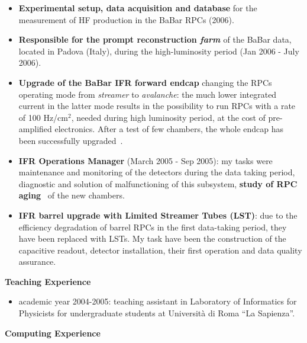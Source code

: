 \documentclass[11pt,twoside,a4paper]{article}
\begin{document}
\begin{enumerate}
\begin{itemize}
  \item {\bf Experimental setup, data acquisition and database} 
    for the measurement of HF production in the BaBar RPCs (2006).
    
  \item {\bf Responsible for the prompt reconstruction {\it farm }}
    of the BaBar data, located in Padova (Italy), during the
    high-luminosity period (Jan 2006 - July 2006).

  \item {\bf Upgrade of the BaBar IFR forward endcap} changing the
    RPCs operating mode from {\it streamer} to {\it avalanche}: the
    much lower integrated current in the latter mode results in the
    possibility to run RPCs with a rate of 100 Hz/cm$^2$, needed
    during high luminosity period, at the cost of pre-amplified
    electronics.  After a test of few chambers, the whole endcap has
    been successfully upgraded~\cite{BandProc}.

  \item {\bf IFR Operations Manager} (March 2005 - Sep 2005): my tasks
    were maintenance and monitoring of the detectors during the data
    taking period, diagnostic and solution of malfunctioning of this
    subsystem, {\bf study of RPC aging}~\cite{Anulli:2005wi} of the
    new chambers.

  \item {\bf IFR barrel upgrade with Limited Streamer Tubes (LST)}:
    due to the efficiency degradation of barrel RPCs in the first
    data-taking period, they have been replaced with LSTs. My task
    have been the construction of the capacitive readout, detector
    installation, their first operation and data quality
    assurance.

  \end{itemize}

\end{enumerate}

\begin{center}
{ \bf Teaching Experience }

\end{center}

 \begin{itemize}  
 \item academic year 2004-2005: teaching assistant in Laboratory
   of Informatics for Physicists for undergraduate students at
   Universit\`a di Roma ``La Sapienza''.
\end{itemize}

\begin{center}
 { \bf Computing  Experience }
\end{center}
\end{document}
